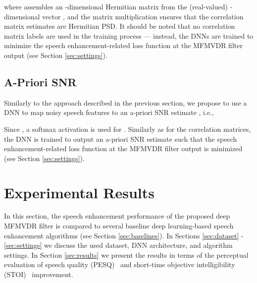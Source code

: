 \documentclass{article}
\begin{document}
where  assembles an -dimensional Hermitian matrix from the (real-valued) -dimensional vector , and the matrix multiplication ensures that the correlation matrix estimates are Hermitian PSD.
It should be noted that no correlation matrix labels are used in the training process --- instead, the DNNs are trained to minimize the speech enhancement-related loss function at the MFMVDR filter output (see Section \ref{sec:settings}).

\subsection{A-Priori SNR}
\label{sec:a-priori snr}
Similarly to the approach described in the previous section, we propose to use a DNN  to map noisy speech features to an a-priori SNR estimate , i.e.,

Since , a softmax activation is used for .
Similarly as for the correlation matrices, the DNN is trained to output an a-priori SNR estimate  such that the speech enhancement-related loss function at the MFMVDR filter output is minimized (see Section \ref{sec:settings}).

\section{Experimental Results}
In this section, the speech enhancement performance of the proposed deep MFMVDR filter is compared to several baseline deep learning-based speech enhancement algorithms (see Section \ref{sec:baselines}).
In Sections \ref{sec:dataset} - \ref{sec:settings} we discuss the used dataset, DNN architecture, and algorithm settings.
In Section \ref{sec:results} we present the results in terms of the perceptual evaluation of speech quality (PESQ)~\cite{itu-t_perceptual_2001} and short-time objective intelligibility (STOI)~\cite{taal_algorithm_2011} improvement.
\end{document}
